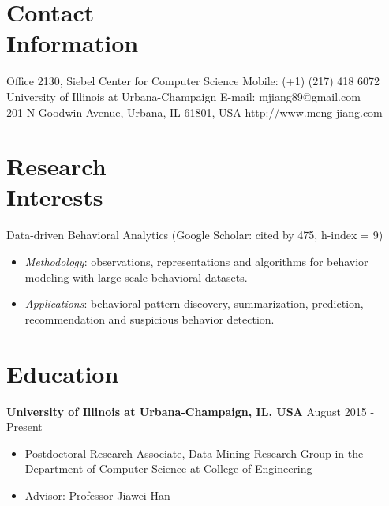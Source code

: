 \documentclass[margin, 10pt]{res} %
\begin{document}
\begin{resume}


\section{Contact \\ Information}

{Office 2130, Siebel Center for Computer Science} \hfill {Mobile:} {(+1) (217) 418 6072} \\
{University of Illinois at Urbana-Champaign} \hfill {E-mail:} {mjiang89@gmail.com} \\
{201 N Goodwin Avenue, Urbana, IL 61801, USA} \hfill {http://www.meng-jiang.com}


\section{Research \\ Interests}

Data-driven Behavioral Analytics (Google Scholar: cited by 475, h-index = 9)
\begin{itemize}
	\item {\em Methodology}: observations, representations and algorithms for
		behavior modeling with large-scale behavioral datasets.
	\item {\em Applications}: behavioral pattern discovery, summarization, prediction,
		recommendation and suspicious behavior detection.
\end{itemize}


\section{Education}

{\bf University of Illinois at Urbana-Champaign, IL, USA} \hfill {August 2015 - Present}
\begin{itemize} \itemsep -2pt %
	\item Postdoctoral Research Associate, Data Mining Research Group in the Department of Computer Science at College of Engineering
	\item Advisor: Professor Jiawei Han
\end{itemize}


\end{resume}
\end{document}
